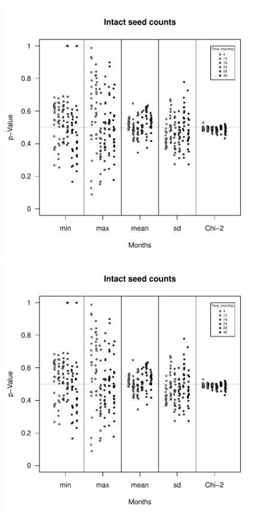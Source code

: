 \documentclass[12pt, oneside, titlepage]{article}   	%
\begin{document}
\begin{figure}[!h]
   \centering
       \includegraphics[page=1,scale=.5]{../../figures/modelChecks/decay-ppc.pdf}  
       \includegraphics[page=2,scale=.5]{../../figures/modelChecks/decay-ppc.pdf}  
 \label{fig:name}
\end{figure}
\end{document}
